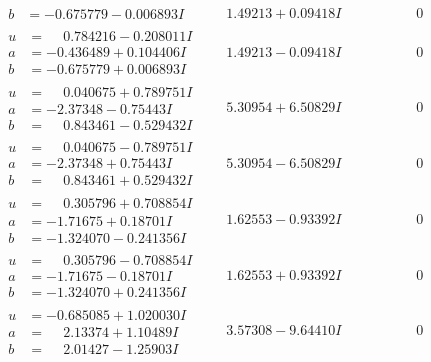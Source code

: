 \documentclass[1p]{elsarticle_modified}
\theoremstyle{definition}
\begin{document}
$$\begin{array}{c|c|c}
\begin{aligned}
b &= -0.675779 - 0.006893 I\end{aligned}
 & \phantom{-}1.49213 + 0.09418 I & \phantom{-0.000000 } 0 \\ \hline\begin{aligned}
u &= \phantom{-}0.784216 - 0.208011 I \\
a &= -0.436489 + 0.104406 I \\
b &= -0.675779 + 0.006893 I\end{aligned}
 & \phantom{-}1.49213 - 0.09418 I & \phantom{-0.000000 } 0 \\ \hline\begin{aligned}
u &= \phantom{-}0.040675 + 0.789751 I \\
a &= -2.37348 - 0.75443 I \\
b &= \phantom{-}0.843461 - 0.529432 I\end{aligned}
 & \phantom{-}5.30954 + 6.50829 I & \phantom{-0.000000 } 0 \\ \hline\begin{aligned}
u &= \phantom{-}0.040675 - 0.789751 I \\
a &= -2.37348 + 0.75443 I \\
b &= \phantom{-}0.843461 + 0.529432 I\end{aligned}
 & \phantom{-}5.30954 - 6.50829 I & \phantom{-0.000000 } 0 \\ \hline\begin{aligned}
u &= \phantom{-}0.305796 + 0.708854 I \\
a &= -1.71675 + 0.18701 I \\
b &= -1.324070 - 0.241356 I\end{aligned}
 & \phantom{-}1.62553 - 0.93392 I & \phantom{-0.000000 } 0 \\ \hline\begin{aligned}
u &= \phantom{-}0.305796 - 0.708854 I \\
a &= -1.71675 - 0.18701 I \\
b &= -1.324070 + 0.241356 I\end{aligned}
 & \phantom{-}1.62553 + 0.93392 I & \phantom{-0.000000 } 0 \\ \hline\begin{aligned}
u &= -0.685085 + 1.020030 I \\
a &= \phantom{-}2.13374 + 1.10489 I \\
b &= \phantom{-}2.01427 - 1.25903 I\end{aligned}
 & \phantom{-}3.57308 - 9.64410 I & \phantom{-0.000000 } 0 \\ \hline\begin{aligned}

\end{aligned}
\end{array}$$
\end{document}
